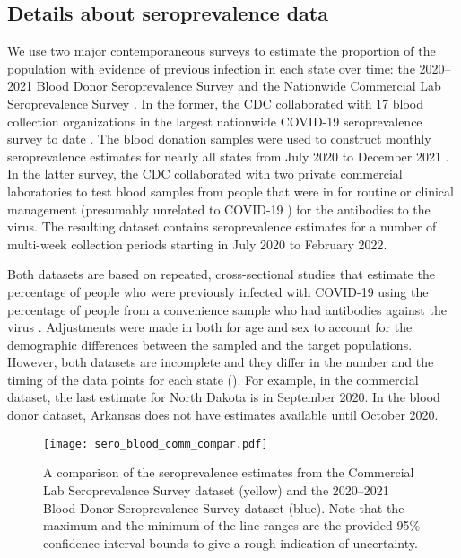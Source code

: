 \subsection{Details about seroprevalence data}
\label{supp:sero-details}

We use two major contemporaneous surveys to estimate the proportion of the
population with evidence of previous infection in each state over time: the
2020--2021 Blood Donor Seroprevalence Survey and the Nationwide Commercial Lab
Seroprevalence Survey \citep{cdc2021blood, cdc2021comm}. In the former, the CDC
collaborated with 17 blood collection organizations in the largest nationwide
COVID-19 seroprevalence survey to date \citep{cdc2021blood}. The blood donation
samples were used to construct monthly seroprevalence estimates for nearly all
states from July 2020 to December 2021 \citep{jones2021estimated}. In the latter
survey, the CDC collaborated with two private commercial laboratories to test
blood samples from people that were in for routine or clinical management
(presumably unrelated to COVID-19 \citealp{bajema2021estimated}) for the
antibodies to the virus. The resulting dataset contains seroprevalence estimates
for a number of multi-week collection periods starting in July 2020 to February
2022. 

Both datasets are based on repeated, cross-sectional studies that estimate the
percentage of people who were previously infected with COVID-19 using the
percentage of people from a convenience sample who had antibodies against the
virus \citep{bajema2021estimated, cdc2020data, jones2021estimated}. Adjustments
were made in both for age and sex to account for the demographic differences
between the sampled and the target populations. However, both datasets are
incomplete and they differ in the number and the timing of the data points for
each state (). For example, in the
commercial dataset, the last estimate for North Dakota is in September 2020. In
the blood donor dataset, Arkansas does not have estimates available until
October 2020. 

\begin{figure}[!tb]
\centering
    \texttt{[image: sero\_blood\_comm\_compar.pdf]}
    \caption{A comparison of the seroprevalence estimates from the Commercial
    Lab Seroprevalence Survey dataset (yellow) and the 2020--2021 Blood Donor 
    Seroprevalence Survey dataset (blue). Note that the maximum and the minimum
    of the line ranges are the provided 95\% confidence interval bounds to 
    give a rough indication of uncertainty.}
    \label{fig:sero-blood-comm-compar}
\end{figure}
    
